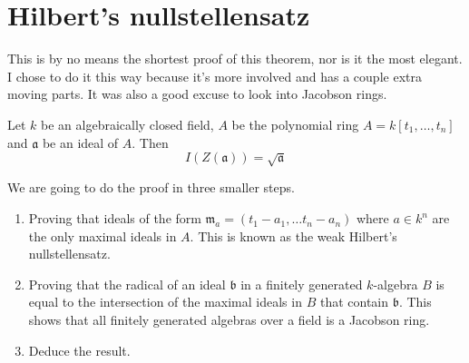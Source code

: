 

\section{Hilbert's nullstellensatz}

This is by no means the shortest proof of this theorem, 
nor is it the most elegant. 
I chose to do it this way because it's more involved and has a couple extra moving parts. 
It was also a good excuse to look into Jacobson rings. 

\begin{theorem}
Let $k$ be an algebraically closed field, 
$A$ be the polynomial ring $A = k[t_1, \ldots, t_n]$ and $\mathfrak{a}$ be an ideal of $A$. 
Then
\begin{equation*}
    I(Z(\mathfrak{a})) = \sqrt{\mathfrak{a}}
\end{equation*}
\end{theorem}

We are going to do the proof in three smaller steps. 
\begin{enumerate}
    \item Proving that ideals of the form $\mathfrak{m}_a = (t_1 - a_1, \ldots t_n - a_n)$ where $a\in k^n$ are the only maximal ideals in $A$. 
    This is known as the weak Hilbert's nullstellensatz. 
    \item Proving that the radical of an ideal $\mathfrak{b}$ in a finitely generated $k$-algebra $B$ is equal to the intersection of the maximal ideals in $B$ that contain $\mathfrak{b}$. 
    This shows that all finitely generated algebras over a field is a Jacobson ring. 
    \item Deduce the result. 
\end{enumerate}

